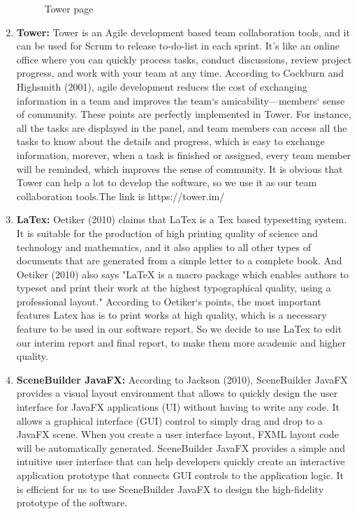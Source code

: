 \documentclass[paper=a4, fontsize=11pt,twoside]{scrartcl}		%
\begin{document}
\begin{enumerate}
\begin{figure}[htbp]
\caption{Tower page}
\label{tower}
\end{figure}
	\item \textbf{Tower: } Tower is an Agile development based team collaboration tools, and it can be used for Scrum to release to-do-list in each sprint. It's like an online office where you can quickly process tasks, conduct discussions, review project progress, and work with your team at any time. According to Cockburn and Highsmith (2001), agile development reduces the cost of exchanging information in a team and improves the team`s amicability---members` sense of community. These points are perfectly implemented in Tower. For instance, all the tasks are displayed  in the panel, and team members can access all the tasks to know about the details and progress, which is easy to exchange information, morever, when a task is finished or assigned, every team member will be reminded, which improves the sense of community. It is obvious that Tower can help a lot to develop the software, so we use it as our team collaboration tools.The link is {https://tower.im/} 
	\item \textbf{LaTex: } Oetiker (2010) claims that LaTex is a Tex based typesetting system. It is suitable for the production of high printing quality of science and technology and mathematics, and it also applies to all other types of documents that are generated from a simple letter to a complete book. And Oetiker (2010) also says "LaTeX is a macro package which enables authors to typeset and print their work at the highest typographical quality, using a professional layout." According to Oetiker`s points, the most important features Latex has is to print works at high quality, which is a necessary feature to be used in our software report. So we decide to use LaTex to edit our interim report and final report, to make them more academic and higher quality.
	\item \textbf{SceneBuilder JavaFX: } According to Jackson (2010), SceneBuilder JavaFX provides a visual layout environment that allows to quickly design the user interface for JavaFX applications (UI) without having to write any code. It allows a graphical interface (GUI) control to simply drag and drop to a JavaFX scene. When you create a user interface layout, FXML layout code will be automatically generated. SceneBuilder JavaFX provides a simple and intuitive user interface that can help developers quickly create an interactive application prototype that connects GUI controls to the application logic. It is efficient for us to use SceneBuilder JavaFX to design the high-fidelity prototype of  the software.
\end{enumerate}
\clearpage
\end{document}
